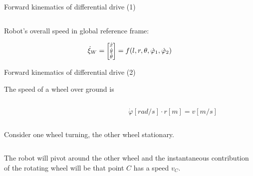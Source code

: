 \documentclass[compress]{beamer}
\newcommand{\colvec}[2][.8]{%
  \scalebox{#1}{%
    \renewcommand{\arraystretch}{.8}%
    $\begin{bmatrix}#2\end{bmatrix}$%
  }
}
\begin{document}
\begin{frame}{Forward kinematics of differential drive (1)}
\begin{columns}
\begin{column}{0.5\linewidth}
{\begin{tikzpicture}
                \end{tikzpicture}
            }

        \end{column}
    \end{columns}

    Robot's overall speed in global reference frame:

    \[
        \dot\xi_W = \colvec{\dot{x} \\ \dot{y} \\ \dot\theta} = f(l, r, \theta,
        \dot\varphi_1, \dot\varphi_2)
        \]

\end{frame}

\begin{frame}{Forward kinematics of differential drive (2)}

    The speed of a wheel over ground is

    \begin{columns}
        \begin{column}{0.5\linewidth}

        \end{column}
        \begin{column}{0.5\linewidth}
            \[
                \dot\varphi [rad/s]\cdot r [m] = v [m/s]
            \]
        \end{column}
    \end{columns}

    \pause
    Consider one wheel turning, the other wheel stationary.
    \vspace{1em}

    \begin{columns}
        \begin{column}{0.5\linewidth}
The robot will pivot around the other wheel and the instantaneous
            contribution of the rotating wheel will be that point $C$ has a
            speed $v_C$.


\end{column}
\end{columns}
\end{frame}
\end{document}
